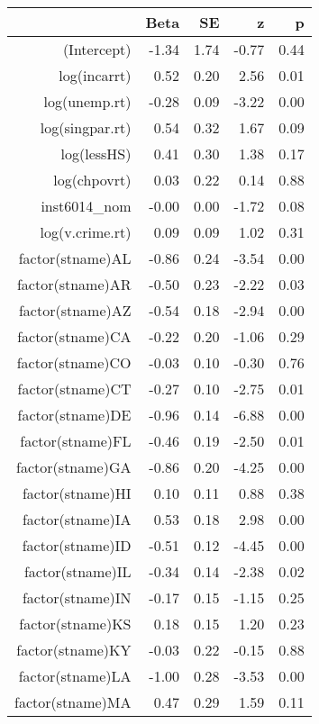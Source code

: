\begin{table}[ht]
\centering
\begin{tabular}{rrrrr}
  \hline
 & Beta & SE & z & p \\ 
  \hline
(Intercept) & -1.34 & 1.74 & -0.77 & 0.44 \\ 
  log(incarrt) & 0.52 & 0.20 & 2.56 & 0.01 \\ 
  log(unemp.rt) & -0.28 & 0.09 & -3.22 & 0.00 \\ 
  log(singpar.rt) & 0.54 & 0.32 & 1.67 & 0.09 \\ 
  log(lessHS) & 0.41 & 0.30 & 1.38 & 0.17 \\ 
  log(chpovrt) & 0.03 & 0.22 & 0.14 & 0.88 \\ 
  inst6014\_nom & -0.00 & 0.00 & -1.72 & 0.08 \\ 
  log(v.crime.rt) & 0.09 & 0.09 & 1.02 & 0.31 \\ 
  factor(stname)AL & -0.86 & 0.24 & -3.54 & 0.00 \\ 
  factor(stname)AR & -0.50 & 0.23 & -2.22 & 0.03 \\ 
  factor(stname)AZ & -0.54 & 0.18 & -2.94 & 0.00 \\ 
  factor(stname)CA & -0.22 & 0.20 & -1.06 & 0.29 \\ 
  factor(stname)CO & -0.03 & 0.10 & -0.30 & 0.76 \\ 
  factor(stname)CT & -0.27 & 0.10 & -2.75 & 0.01 \\ 
  factor(stname)DE & -0.96 & 0.14 & -6.88 & 0.00 \\ 
  factor(stname)FL & -0.46 & 0.19 & -2.50 & 0.01 \\ 
  factor(stname)GA & -0.86 & 0.20 & -4.25 & 0.00 \\ 
  factor(stname)HI & 0.10 & 0.11 & 0.88 & 0.38 \\ 
  factor(stname)IA & 0.53 & 0.18 & 2.98 & 0.00 \\ 
  factor(stname)ID & -0.51 & 0.12 & -4.45 & 0.00 \\ 
  factor(stname)IL & -0.34 & 0.14 & -2.38 & 0.02 \\ 
  factor(stname)IN & -0.17 & 0.15 & -1.15 & 0.25 \\ 
  factor(stname)KS & 0.18 & 0.15 & 1.20 & 0.23 \\ 
  factor(stname)KY & -0.03 & 0.22 & -0.15 & 0.88 \\ 
  factor(stname)LA & -1.00 & 0.28 & -3.53 & 0.00 \\ 
  factor(stname)MA & 0.47 & 0.29 & 1.59 & 0.11 \\ 

\end{tabular}
\end{table}
